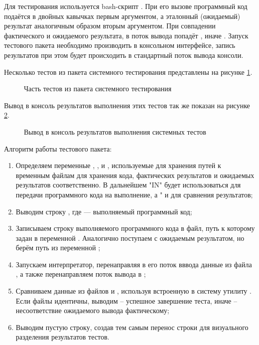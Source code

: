 Для тестирования используется bash-скрипт . При его вызове программный код подаётся в двойных кавычках первым аргументом, а эталонный (ожидаемый) результат аналогичным образом вторым аргументом. При совпадении фактического и ожидаемого результата, в поток вывода \cite{e28} попадёт , иначе . Запуск тестового пакета необходимо производить в консольном интерфейсе, запись результатов при этом будет происходить в стандартный поток вывода консоли.

Несколько тестов из пакета системного тестирования представлены на рисунке \ref{system_test_code:image}.

\begin{figure}[ht]
	\caption{Часть тестов из пакета системного тестирования}
	\label{system_test_code:image}
\end{figure}

Вывод в консоль результатов выполнения этих тестов так же показан на рисунке \ref{system_test_res:image}.

\begin{figure}[H]
	\caption{Вывод в консоль результатов выполнения системных тестов}
	\label{system_test_res:image}
\end{figure}

Алгоритм работы тестового пакета:

\begin{enumerate}
\item Определяем переменные , , и , используемые для хранения путей к временным файлам для хранения кода, фактических результатов и ожидаемых результатов соответственно. В дальнейшем "IN" будет использоваться для передачи программного кода на выполнение, а " и  для сравнения результатов;

\item Выводим строку , где  — выполняемый программный код;

\item Записываем строку выполняемого программного кода в файл, путь к которому задан в переменной . Аналогично поступаем с ожидаемым результатом, но берём путь из переменной ;

\item Запускаем интерпретатор, перенаправляя в его поток вввода данные из файла , а также перенаправляем поток вывода в ;

\item Сравниваем данные из файлов  и , используя встроенную в систему утилиту  \cite{e24}. Если файлы идентичны, выводим  -- успешное завершение теста, иначе  -- несоответствие ожидаемого вывода фактическому;

\item Выводим пустую строку, создав тем самым перенос строки для визуального разделения результатов тестов.

\end{enumerate}

